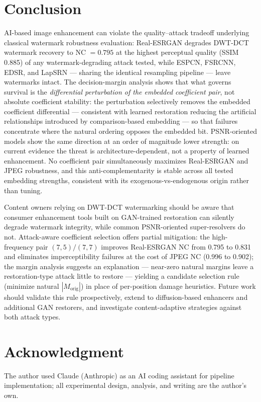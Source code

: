 \documentclass[conference]{IEEEtran}
\begin{document}
\section{Conclusion}
\label{sec:conclusion}

AI-based image enhancement can violate the quality--attack tradeoff
underlying classical watermark robustness evaluation: Real-ESRGAN
degrades DWT-DCT
watermark recovery to NC $= 0.795$ at the highest perceptual quality
(SSIM 0.885) of any watermark-degrading attack tested, while ESPCN,
FSRCNN, EDSR, and LapSRN --- sharing the identical resampling pipeline ---
leave watermarks intact. The decision-margin analysis shows that what
governs survival is the \emph{differential perturbation of the embedded
coefficient pair}, not absolute coefficient stability: the perturbation
selectively removes the embedded coefficient differential --- consistent
with learned restoration reducing the artificial relationships
introduced by comparison-based embedding --- so that failures
concentrate where the natural ordering opposes the embedded bit.
PSNR-oriented models show the same direction at an order of magnitude
lower strength: on current evidence the threat is
architecture-dependent, not a property of learned enhancement. No coefficient pair simultaneously maximizes Real-ESRGAN and
JPEG robustness, and this anti-complementarity is stable across all
tested embedding strengths, consistent with its exogenous-vs-endogenous
origin rather than tuning.

Content owners relying on DWT-DCT watermarking should be aware that
consumer enhancement tools built on GAN-trained restoration can
silently degrade watermark integrity, while common PSNR-oriented
super-resolvers do not. Attack-aware coefficient selection offers
partial mitigation: the high-frequency pair $(7,5)/(7,7)$ improves
Real-ESRGAN NC from 0.795 to 0.831 and eliminates imperceptibility
failures at the cost of JPEG NC (0.996 to 0.902); the margin analysis
suggests an explanation --- near-zero natural margins leave a
restoration-type attack little to restore --- yielding a candidate
selection rule (minimize natural $|M_{\mathrm{orig}}|$) in place of
per-position damage heuristics. Future work should validate this rule prospectively, extend to
diffusion-based enhancers and additional GAN restorers, and investigate
content-adaptive strategies against both attack types.

\section*{Acknowledgment}
The author used Claude (Anthropic) as an AI coding assistant for
pipeline implementation; all experimental design, analysis, and
writing are the author's own.



\end{document}

